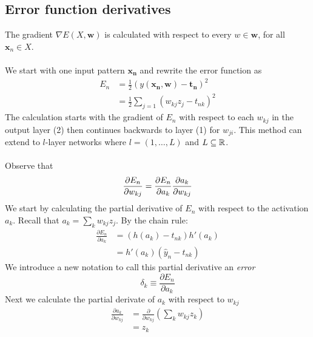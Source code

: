 \subsection{Error function derivatives}
The gradient $\nabla E(X, \mathbf{w})$ is calculated with respect to every 
$w \in \mathbf{w}$, for all $\mathbf{x}_n \in X$. 
\\\\
We start with one input pattern $\mathbf{x_n}$ and rewrite the error function as 
\begin{equation}
    \begin{split}
    E_n &= \frac{1}{2} \left(y(\mathbf{x_n}, \mathbf{w}) - \mathbf{t_n} \right)^2  \\
     &= \frac{1}{2} \sum_{j=1} (w_{kj}z_{j} - t_{nk})^2
    \end{split}
\end{equation} 
The calculation starts with the gradient of $E_n$ with respect to each $w_{kj}$ in 
the output layer (2) then continues backwards to layer (1) for $w_{ji}$. 
This method can extend to $l$-layer networks where $l = (1, \ldots, L)$ and 
$L \subseteq \mathbb R$.
\\\\
Observe that
\begin{equation}
    \frac{\partial E_n}{\partial w_{kj}} = \frac{\partial E_n}{\partial a_k} \\
    \frac{\partial a_k}{\partial w_{kj}}
\end{equation}
We start by calculating the partial derivative of $E_n$ with respect to the 
activation $a_k$. Recall that $a_k = \sum_{k} w_{kj}{z_j}$. By the chain rule:
\begin{equation}
    \begin{split}
    \frac{\partial E_n}{\partial a_k} &= (h(a_k) - t_{nk})h'(a_k) \\
    &= h'(a_k)(\hat{y}_n - t_{nk})
    \end{split}
\end{equation}
We introduce a new notation to call this partial derivative an \textit{error}
\begin{equation}
    \delta_{k} \equiv \frac{\partial E_n}{\partial a_k} 
\end{equation}
Next we calculate the partial derivate of $a_k$ with respect to $w_{kj}$
\begin{equation}
    \begin{split}
    \frac{\partial a_k}{\partial w_{kj}} &= \frac{\partial}{\partial w_{kj}} \left( \sum_{k} w_{kj}z_{k} \right) \\
    &= z_{k}
    \end{split}
\end{equation} 
